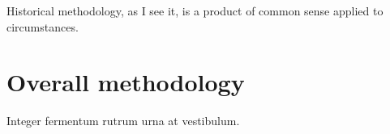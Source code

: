 

\begin{savequote}[50mm]
Historical methodology, as I see it, is a product of common sense applied to circumstances. 
\end{savequote}


\chapter{Overall methodology}
\label{cha:Overall methodology}

\ifpdf
    \graphicspath{{3_overall_methodology/figures/PNG/}{3_overall_methodology/figures/PDF/}{3_overall_methodology/figures/}}
\else
    \graphicspath{{3_overall_methodology/figures/EPS/}{3_overall_methodology/figures/}}
\fi



Integer fermentum rutrum urna at vestibulum.





